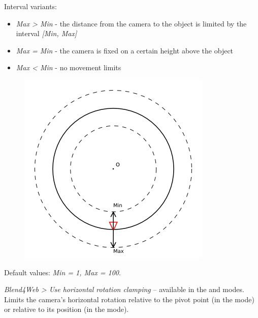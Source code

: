\documentclass[a4paper,12pt,oneside]{sphinxmanual}
\begin{document}
Interval variants:
\begin{itemize}
\item {} 
\emph{Max \textgreater{} Min} - the distance from the camera to the object is limited by the interval \emph{{[}Min, Max{]}}

\item {} 
\emph{Max = Min} - the camera is fixed on a certain height above the object

\item {} 
\emph{Max \textless{} Min} - no movement limits

\end{itemize}
\begin{figure}[htbp]
\centering

\includegraphics{distance_limits.png}
\end{figure}

\begin{DUlineblock}{0em}
\item[] 
\end{DUlineblock}

Default values: \emph{Min = 1, Max = 100}.

\begin{DUlineblock}{0em}
\item[] 
\end{DUlineblock}

\emph{Blend4Web \textgreater{} Use horizontal rotation clamping} -- available in the  and  modes. Limits the camera's horizontal rotation relative to the pivot point (in the  mode) or relative to its position (in the  mode).
\end{document}
